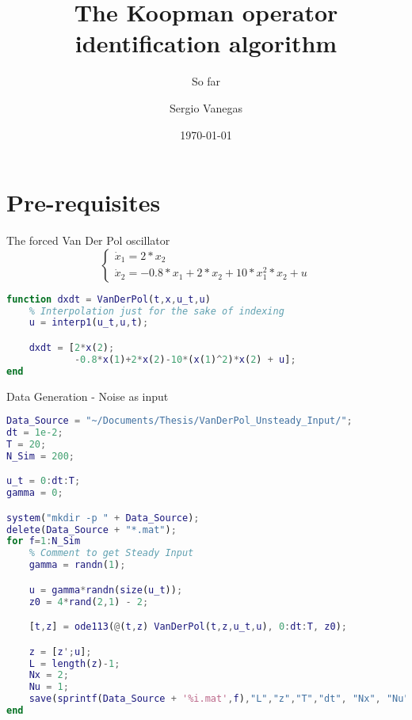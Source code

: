 \documentclass{beamer}
\title[Process]{The Koopman operator identification algorithm}
\subtitle{So far}
\author{Sergio Vanegas}
\date{\today}
\begin{document}
\begin{frame}
    \maketitle
\end{frame}


\section{Pre-requisites}

\begin{frame}[fragile]{The forced Van Der Pol oscillator}
    \begin{equation}
        \begin{cases}
            \dot{x}_1 = 2*x_2 \\
            \dot{x}_2 = -0.8*x_1 + 2*x_2 + 10*x_1^2*x_2 + u
        \end{cases}
    \end{equation}

    \begin{lstlisting}[language=Matlab]
function dxdt = VanDerPol(t,x,u_t,u)
    % Interpolation just for the sake of indexing
    u = interp1(u_t,u,t);

    dxdt = [2*x(2);
            -0.8*x(1)+2*x(2)-10*(x(1)^2)*x(2) + u];
end
    \end{lstlisting}
\end{frame}

\begin{frame}[fragile]{Data Generation - Noise as input}
    \begin{lstlisting}[language=Matlab,basicstyle=\tiny]
Data_Source = "~/Documents/Thesis/VanDerPol_Unsteady_Input/";
dt = 1e-2;
T = 20;
N_Sim = 200;

u_t = 0:dt:T;
gamma = 0;

system("mkdir -p " + Data_Source);
delete(Data_Source + "*.mat");
for f=1:N_Sim
    % Comment to get Steady Input
    gamma = randn(1);

    u = gamma*randn(size(u_t));
    z0 = 4*rand(2,1) - 2;

    [t,z] = ode113(@(t,z) VanDerPol(t,z,u_t,u), 0:dt:T, z0);

    z = [z';u];
    L = length(z)-1;
    Nx = 2;
    Nu = 1;
    save(sprintf(Data_Source + '%i.mat',f),"L","z","T","dt", "Nx", "Nu");
end
    \end{lstlisting}
\end{frame}
\end{document}
